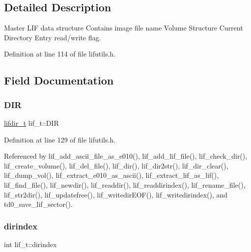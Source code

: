 \subsection{Detailed Description}
Master L\+IF data structure Contains image file name Volume Structure Current Directory Entry read/write flag. 

Definition at line 114 of file lifutils.\+h.



\subsection{Field Documentation}
\mbox{\label{structlif__t_aefeaa526c04a2b8715b0392feeec52a3}} 
\subsubsection{\texorpdfstring{D\+IR}{DIR}}
{\footnotesize\ttfamily \hyperlink{structlifdir__t}{lifdir\+\_\+t} lif\+\_\+t\+::\+D\+IR}



Definition at line 129 of file lifutils.\+h.



Referenced by lif\+\_\+add\+\_\+ascii\+\_\+file\+\_\+as\+\_\+e010(), lif\+\_\+add\+\_\+lif\+\_\+file(), lif\+\_\+check\+\_\+dir(), lif\+\_\+create\+\_\+volume(), lif\+\_\+del\+\_\+file(), lif\+\_\+dir(), lif\+\_\+dir2str(), lif\+\_\+dir\+\_\+clear(), lif\+\_\+dump\+\_\+vol(), lif\+\_\+extract\+\_\+e010\+\_\+as\+\_\+ascii(), lif\+\_\+extract\+\_\+lif\+\_\+as\+\_\+lif(), lif\+\_\+find\+\_\+file(), lif\+\_\+newdir(), lif\+\_\+readdir(), lif\+\_\+readdirindex(), lif\+\_\+rename\+\_\+file(), lif\+\_\+str2dir(), lif\+\_\+updatefree(), lif\+\_\+writedir\+E\+O\+F(), lif\+\_\+writedirindex(), and td0\+\_\+save\+\_\+lif\+\_\+sector().

\mbox{\label{structlif__t_a74f8af3dc203c3c6b9dea3829bb4b6fa}} 
\subsubsection{\texorpdfstring{dirindex}{dirindex}}
{\footnotesize\ttfamily int lif\+\_\+t\+::dirindex}



